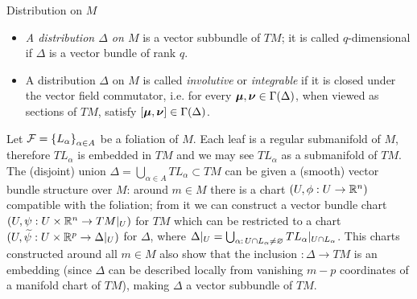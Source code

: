 \begin{definition}{Distribution on $M$}
\begin{itemize}
    \item \emph{A distribution $\Delta$ on $M$} is a vector subbundle of $TM$; it is called $q$-dimensional if $\Delta$ is a vector bundle of rank $q$.
    
    \item A distribution $\Delta$ on $M$ is called \emph{involutive} or \emph{integrable} if it is closed under the vector field commutator, i.e. for every $\bm{\mu}, \bm{\nu} \in \Gamma(\Delta)$, when viewed as sections of $TM$, satisfy $[\bm{\mu}, \bm{\nu}] \in \Gamma(\Delta)$.
\end{itemize}
\end{definition}

Let $\mathcal F = \left\{ L_\alpha \right\}_{\alpha \in A}$ be a foliation of $M$. Each leaf is a regular submanifold of $M$, therefore $T L_\alpha$ is embedded in $TM$ and we may see $T L_\alpha$ as a submanifold of $TM$. The (disjoint) union $\Delta = \bigcup_{\alpha \in A} T L_\alpha \subset TM$ can be given a (smooth) vector bundle structure over $M$: around $m \in M$ there is a chart $(U, \phi:U \to \RR^n)$ compatible with the foliation; from it we can construct a vector bundle chart $(U, \psi: U \times \mathbb{R}^n \to TM|_{U})$ for $TM$ which can be restricted to a chart $(U, \widetilde{\psi}: U \times \mathbb{R}^p \to \Delta|_{U})$ for $\Delta$, where $\Delta|_U = \bigcup_{\alpha: \, U \cap L_\alpha \neq \varnothing} T L_\alpha|_{U\cap L_\alpha}$. This charts constructed around all $m\in M$ also show that the inclusion $:\Delta \to TM$ is an embedding (since $\Delta$ can be described locally from vanishing $m-p$ coordinates of a manifold chart of $TM$), making $\Delta$ a vector subbundle of $TM$.

